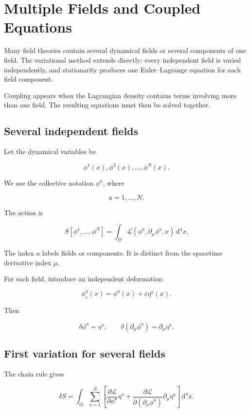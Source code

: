 \section{Multiple Fields and Coupled Equations}
\label{sec:multiple_fields_and_coupled_equations}

Many field theories contain several dynamical fields or several components of one field. The variational method extends directly: every independent field is varied independently, and stationarity produces one Euler--Lagrange equation for each field component.

Coupling appears when the Lagrangian density contains terms involving more than one field. The resulting equations must then be solved together.

\subsection{Several independent fields}

Let the dynamical variables be

\[
\phi^{1}(x),\phi^{2}(x),\ldots,\phi^{N}(x).
\]

We use the collective notation \(\phi^{a}\), where

\[
a=1,\ldots,N.
\]

The action is

\[
\boxed{
S[\phi^{1},\ldots,\phi^{N}]
=
\int_{\Omega}
\mathcal{L}(
\phi^{a},
\partial_{\mu}\phi^{a},
x)
\,\mathrm{d}^{4}x
}.
\]

The index \(a\) labels fields or components. It is distinct from the spacetime derivative index \(\mu\).

For each field, introduce an independent deformation:

\[
\phi^{a}_{\varepsilon}(x)
=
\phi^{a}(x)+\varepsilon\eta^{a}(x).
\]

Then

\[
\delta\phi^{a}=\eta^{a},
\qquad
\delta(\partial_{\mu}\phi^{a})
=
\partial_{\mu}\eta^{a}.
\]

\subsection{First variation for several fields}

The chain rule gives

\[
\delta S
=
\int_{\Omega}
\sum_{a=1}^{N}
\left[
\frac{\partial\mathcal{L}}{\partial\phi^{a}}
\eta^{a}
+
\frac{\partial\mathcal{L}}
{\partial(\partial_{\mu}\phi^{a})}
\partial_{\mu}\eta^{a}
\right]
\,\mathrm{d}^{4}x.
\]

